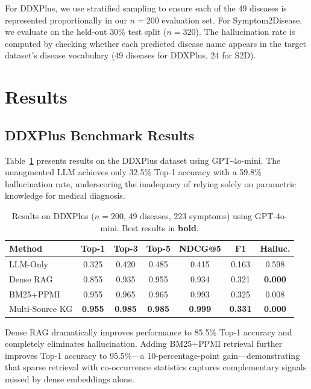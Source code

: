 \documentclass[review]{elsarticle}
\begin{document}
For DDXPlus, we use stratified sampling to ensure each of the 49 diseases is represented proportionally in our $n{=}200$ evaluation set. For Symptom2Disease, we evaluate on the held-out 30\% test split ($n{=}320$). The hallucination rate is computed by checking whether each predicted disease name appears in the target dataset's disease vocabulary (49 diseases for DDXPlus, 24 for S2D).

\section{Results}
\label{sec:results}

\subsection{DDXPlus Benchmark Results}

Table~\ref{tab:ddxplus} presents results on the DDXPlus dataset using GPT-4o-mini. The unaugmented LLM achieves only 32.5\% Top-1 accuracy with a 59.8\% hallucination rate, underscoring the inadequacy of relying solely on parametric knowledge for medical diagnosis.

\begin{table}[t]
\centering
\caption{Results on DDXPlus ($n{=}200$, 49 diseases, 223 symptoms) using GPT-4o-mini. Best results in \textbf{bold}.}
\label{tab:ddxplus}
\begin{tabular}{lcccccc}
\toprule
\textbf{Method} & \textbf{Top-1} & \textbf{Top-3} & \textbf{Top-5} & \textbf{NDCG@5} & \textbf{F1} & \textbf{Halluc.} \\
\midrule
LLM-Only       & 0.325 & 0.420 & 0.485 & 0.415 & 0.163 & 0.598 \\
Dense RAG       & 0.855 & 0.935 & 0.955 & 0.934 & 0.321 & \textbf{0.000} \\
BM25+PPMI       & 0.955 & 0.965 & 0.965 & 0.993 & 0.325 & 0.008 \\
Multi-Source KG & \textbf{0.955} & \textbf{0.985} & \textbf{0.985} & \textbf{0.999} & \textbf{0.331} & \textbf{0.000} \\
\bottomrule
\end{tabular}
\end{table}

Dense RAG dramatically improves performance to 85.5\% Top-1 accuracy and completely eliminates hallucination. Adding BM25+PPMI retrieval further improves Top-1 accuracy to 95.5\%---a 10-percentage-point gain---demonstrating that sparse retrieval with co-occurrence statistics captures complementary signals missed by dense embeddings alone.
\end{document}
